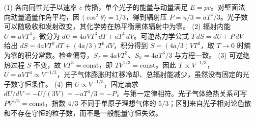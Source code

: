 (1) 各向同性光子以速率 \(c\) 传播，单个光子的能量与动量满足 \(E=pc\)。对壁面法向动量通量作角平均，因 \(\langle\cos^2\theta\rangle=1/3\)，得到辐射压 \(P=u/3=aT^4/3\)。光子数可以随吸收和发射改变，其化学势在热平衡黑体辐射中为零。
(2) 辐射内能 \(U=aVT^4\)，微分为 \(dU=4aVT^3\,dT+aT^4\,dV\)。可逆热力学公式 \(T\,dS=dU+P\,dV\) 给出 \(dS=4aVT^2\,dT+(4a/3)T^3\,dV\)，积分得到 \(S=(4a/3)VT^3\)，取 \(T\to0\) 时熵为零的积分常数。检查偏导，\(S_T=4aVT^2\)、\(S_V=4aT^3/3\) 与方程一致。
(3) 可逆绝热过程 \(S\) 不变，故 \(VT^3=\mathrm{const}\)，即 \(TV^{1/3}=\mathrm{const}\)。因此 \(T\propto V^{-1/3}\)，\(U=aVT^4\propto V^{-1/3}\)，光子气体膨胀时红移冷却、总辐射能减少，虽然没有固定的光子数守恒条件。
(4) 由 \(U\propto V^{-1/3}\)，固定熵求 \(dU/dV=-U/(3V)=-aT^4/3=-P\)，与第一定律相符。光子气体绝热关系可写 \(PV^{4/3}=\mathrm{const}\)，指数 \(4/3\) 不同于单原子理想气体的 \(5/3\)；区别来自光子相对论色散和不存在守恒的粒子数，而不是一般能量守恒失效。
